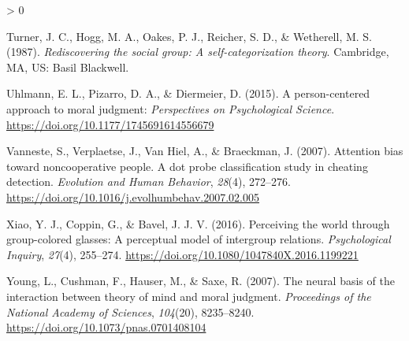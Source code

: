\documentclass[
  english,
  man]{apa6}
\newlength{\cslhangindent}
\newenvironment{CSLReferences}[2] %
 {%
  \setlength{\parindent}{0pt}
  \ifodd #1 \everypar{\setlength{\hangindent}{\cslhangindent}}\ignorespaces\fi
  \ifnum #2 > 0
  \setlength{\parskip}{#2\baselineskip}
  \fi
 }%
 {}
\begin{document}
\begin{CSLReferences}{1}{0}
\leavevmode\hypertarget{ref-turner_rediscovering_1987}{}%
Turner, J. C., Hogg, M. A., Oakes, P. J., Reicher, S. D., \& Wetherell, M. S. (1987). \emph{Rediscovering the social group: A self-categorization theory}. Cambridge, {MA}, {US}: Basil Blackwell.

\leavevmode\hypertarget{ref-uhlmann_person-centered_2015}{}%
Uhlmann, E. L., Pizarro, D. A., \& Diermeier, D. (2015). A person-centered approach to moral judgment: \emph{Perspectives on Psychological Science}. \url{https://doi.org/10.1177/1745691614556679}

\leavevmode\hypertarget{ref-vanneste_attention_2007}{}%
Vanneste, S., Verplaetse, J., Van Hiel, A., \& Braeckman, J. (2007). Attention bias toward noncooperative people. A dot probe classification study in cheating detection. \emph{Evolution and Human Behavior}, \emph{28}(4), 272--276. \url{https://doi.org/10.1016/j.evolhumbehav.2007.02.005}

\leavevmode\hypertarget{ref-xiao_perceiving_2016}{}%
Xiao, Y. J., Coppin, G., \& Bavel, J. J. V. (2016). Perceiving the world through group-colored glasses: A perceptual model of intergroup relations. \emph{Psychological Inquiry}, \emph{27}(4), 255--274. \url{https://doi.org/10.1080/1047840X.2016.1199221}

\leavevmode\hypertarget{ref-young_neural_2007}{}%
Young, L., Cushman, F., Hauser, M., \& Saxe, R. (2007). The neural basis of the interaction between theory of mind and moral judgment. \emph{Proceedings of the National Academy of Sciences}, \emph{104}(20), 8235--8240. \url{https://doi.org/10.1073/pnas.0701408104}

\end{CSLReferences}

\endgroup
\end{document}
